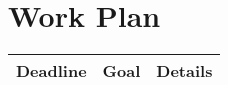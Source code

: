 \documentclass{neh}
\begin{document}
\section{Work Plan}
\begin{tabular}{lll}
    \toprule
    Deadline & Goal & Details \\
    \midrule

\end{tabular}
\end{document}
